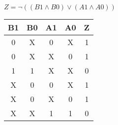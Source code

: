
\begin{center}
    {\(Z = \lnot ((B1 \land B0) \lor (A1 \land A0)) \)}
    \begin{table}[h] %
        \begin{center}
            \begin{tabular}{|c|c|c|c||c|} \hline
            B1 & B0 & A1 & A0 & Z \\ \hline\hline
            0  & X  & 0  & X  & 1 \\ \hline
            0  & X  & X  & 0  & 1 \\ \hline
            1  & 1  & X  & X  & 0 \\ \hline
            X  & 0  & 0  & X  & 1 \\ \hline
            X  & 0  & X  & 0  & 1 \\ \hline
            X  & X  & 1  & 1  & 0 \\ \hline
            \end{tabular}
        \end{center}
    \end{table}
\end{center}
